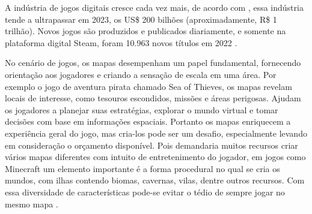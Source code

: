 A indústria de jogos digitais cresce cada vez mais, de acordo com \space{}, essa indústria tende a ultrapassar em 2023, os US\$ 200 bilhões (aproximadamente, R\$ 1 trilhão). Novos jogos são produzidos e publicados diariamente, e somente na plataforma digital Steam, foram 10.963 novos títulos em 2022\space
\cite{numero_de_jogos_publicados_na_steam}.

No cenário de jogos, os mapas desempenham um papel fundamental, fornecendo orientação aos jogadores e criando a sensação de escala em uma área. Por exemplo o jogo de aventura pirata chamado Sea of Thieves, os mapas revelam locais de interesse, como tesouros escondidos, missões e áreas perigosas. Ajudam os jogadores a planejar suas estratégias, explorar o mundo virtual e tomar decisões com base em informações espaciais. Portanto os mapas enriquecem a experiência geral do jogo, mas cria-los pode ser um desafio, especialmente levando em consideração o orçamento disponível. Pois demandaria muitos recursos criar vários mapas diferentes com intuito de entretenimento do jogador, em jogos como Minecraft um elemento importante é a forma procedural no qual se cria os mundos, com ilhas contendo biomas, cavernas, vilas, dentre outros recursos. Com essa diversidade de características pode-se evitar o tédio de sempre jogar no mesmo mapa \cite{video-game-maps, lecafedugeek}.



